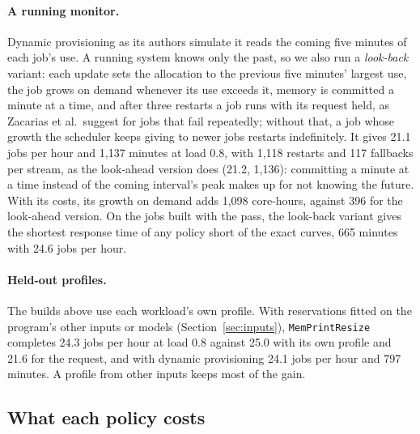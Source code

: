 \documentclass[11pt]{article}
\newcommand{\pass}{\texttt{MemPrintResize}}
\newcommand{\secref}[1]{Section~\ref{#1}}
\newcommand{\term}[1]{\emph{#1}}
\begin{document}
\paragraph{A running monitor.} Dynamic provisioning as its authors simulate it reads the coming five minutes of each
job's use. A running system knows only the past, so we also run a \term{look-back} variant: each update sets the
allocation to the previous five minutes' largest use, the job grows on demand whenever its use exceeds it, memory is
committed a minute at a time, and after three restarts a job runs with its request held, as Zacarias et al.\
suggest for jobs that fail repeatedly; without that, a job whose growth the scheduler keeps giving to newer jobs
restarts indefinitely. It gives 21.1 jobs per hour and 1{,}137 minutes at load 0.8, with 1{,}118 restarts and 117
fallbacks per stream, as the look-ahead version does (21.2, 1{,}136): committing a minute at a time instead of the
coming interval's peak makes up for not knowing the future. With its costs, its growth on demand adds 1{,}098
core-hours, against 396 for the look-ahead version. On the jobs built with the pass, the look-back variant gives the
shortest response time of any policy short of the exact curves, 665 minutes with 24.6 jobs per hour.

\paragraph{Held-out profiles.} The builds above use each workload's own profile. With reservations fitted on the
program's other inputs or models (\secref{sec:inputs}), \pass{} completes 24.3 jobs per hour at load 0.8 against 25.0
with its own profile and 21.6 for the request, and with dynamic provisioning 24.1 jobs per hour and 797 minutes.
A profile from other inputs keeps most of the gain.

\subsection{What each policy costs}
\label{sec:costs}

\begin{table}[t]
\centering\small
\resizebox{\textwidth}{!}{}
\caption{Each policy's own costs at offered load 0.8, demand = RSS, mean of three seeds. Jobs/h and response time
without the policies' costs, and with them, MemPrintResize profiling either at native speed or with the Pin tool. Lost:
core-hours of work lost to OOM kills and restarts. Actions: core-hours that resizes and Pond's mitigations add to the
runs. Profiling: core-hours of the profiling runs (one per workload, at its first job in the stream).}
\label{tab:costs}
\end{table}
\end{document}
